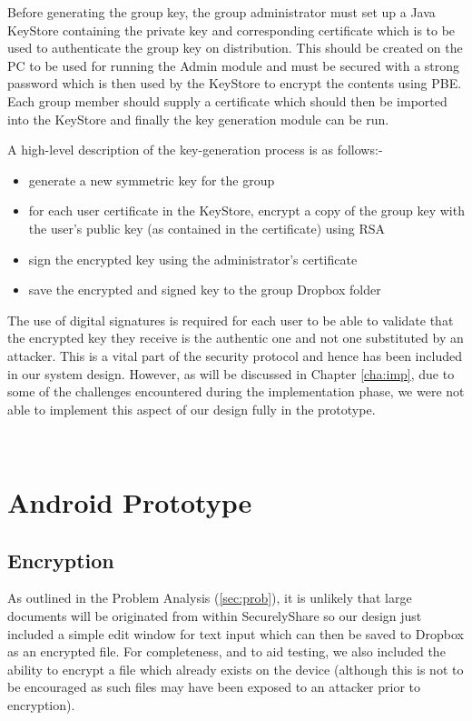 Before generating the group key, the group administrator must set up a Java KeyStore containing the private key and corresponding certificate which is to be used to authenticate the group key on distribution.  This should be created on the PC to be used for running the Admin module and must be secured with a strong password which is then used by the KeyStore to encrypt the contents using PBE.  Each group member should supply a certificate which should then be imported into the KeyStore and finally the key generation module can be run.  

A high-level description of the key-generation process is as follows:-
\begin{itemize}
\item generate a new  symmetric key for the group
\item for each user certificate in the KeyStore, encrypt a copy of the group key with the user's public key (as contained in the certificate) using RSA
\item sign the encrypted key using the administrator's certificate
\item save the encrypted and signed key to the group Dropbox folder 
\end{itemize}

The use of digital signatures is required for each user to be able to validate that the encrypted key they receive is the authentic one and not one substituted by an attacker.  This  is a vital part of the  security protocol and hence has been included in our  system design.  However, as will be discussed in Chapter \ref{cha:imp}, due to some of the challenges encountered during the implementation phase, we were not able to implement this aspect of our design fully in the prototype.

\\

\section{Android Prototype }




\subsection*{Encryption }
As outlined in the Problem Analysis  (\ref{sec:prob}), it is unlikely that large documents will be originated from within SecurelyShare so our design just included a simple  edit window for text input which can then be saved to Dropbox as an encrypted file.  For completeness, and to aid testing, we also included the ability to encrypt a file which already exists on the device (although this is not to be encouraged as such files may have been exposed to an attacker prior to encryption).



